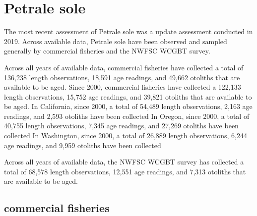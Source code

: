 \documentclass[11pt,
  english,
  letterpaper,
]{article}
\begin{document}

\hypertarget{petrale-sole}{%
\section{Petrale sole}\label{petrale-sole}}

\leavevmode\tagmcend\tagstructend


The most recent assessment of Petrale sole was a update assessment conducted in 2019. Across available data, Petrale sole have been observed and sampled generally by commercial fisheries and the NWFSC WCGBT survey.

\leavevmode\tagmcend\tagstructend\par


Across all years of available data, commercial fisheries have collected a total of 136,238 length observations, 18,591 age readings, and 49,662 otoliths that are available to be aged. Since 2000, commercial fisheries have collected a 122,133 length observations, 15,752 age readings, and 39,821 otoliths that are available to be aged. In California, since 2000, a total of 54,489 length observations, 2,163 age readings, and 2,593 otoliths have been collected In Oregon, since 2000, a total of 40,755 length observations, 7,345 age readings, and 27,269 otoliths have been collected In Washington, since 2000, a total of 26,889 length observations, 6,244 age readings, and 9,959 otoliths have been collected

\leavevmode\tagmcend\tagstructend\par


Across all years of available data, the NWFSC WCGBT survey has collected a total of 68,578 length observations, 12,551 age readings, and 7,313 otoliths that are available to be aged.

\leavevmode\tagmcend\tagstructend\par


\hypertarget{commercial-fisheries-36}{%
\subsection{commercial fisheries}\label{commercial-fisheries-36}}
\end{document}
